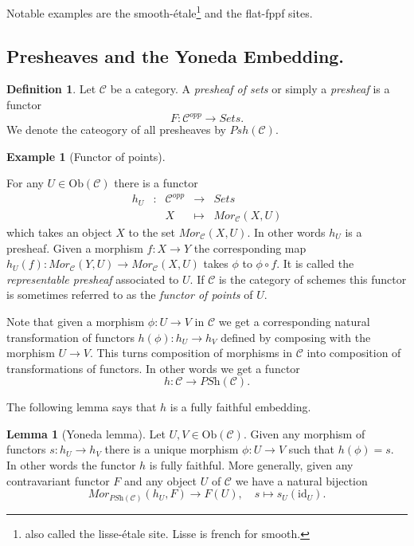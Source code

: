 \documentclass[11pt]{amsart}
\newcommand{\Ob}{\text{Ob}}
\theoremstyle{definition}
\newtheorem{lemma}[theorem]{Lemma}
\newtheorem{definition}[theorem]{Definition}
\newtheorem{example}[theorem]{Example}
\begin{document}
Notable examples are the smooth-\'{e}tale\footnote{also called the lisse-\'{e}tale site. Lisse is french for smooth.} and the flat-fppf sites.

\subsection{Presheaves and the Yoneda Embedding.}

\begin{definition}
	Let $\mathcal{C}$ be a category. A \textit{presheaf of sets} or simply a \textit{presheaf} is a functor
	\[F:\mathcal{C}^{opp}\rightarrow \mathit{Sets}.\]
	We denote the cateogory of all presheaves by $\mathit{Psh}(\mathcal{C})$.
\end{definition}

\begin{example}[Functor of points]
	\label{example-hom-functor}

	For any $U\in \Ob(\mathcal{C})$ there is a
	functor
	$$
	\begin{matrix}
	h_U & : & \mathcal{C}^{opp}
	&
	\longrightarrow
	&
	\textit{Sets} \\
	& &
	X
	&
	\longmapsto
	&
	\textit{Mor}_\mathcal{C}(X, U)
	\end{matrix}
	$$
	which takes an object $X$ to the set
	$\textit{Mor}_\mathcal{C}(X, U)$. In other words $h_U$ is a presheaf.
	Given a morphism $f : X\to Y$ the corresponding map
	$h_U(f) :  \textit{Mor}_\mathcal{C}(Y, U)\to \textit{Mor}_\mathcal{C}(X, U)$
	takes $\phi$ to $\phi\circ f$. It is called the {\it representable presheaf} associated to $U$.
	If $\mathcal{C}$ is the category of schemes this functor is
	sometimes referred to as the
	\emph{functor of points} of $U$.
\end{example}

Note that given a morphism $\phi : U \to V$ in $\mathcal{C}$ we get a
corresponding natural transformation of functors $h(\phi) : h_U \to h_V$
defined by composing with the morphism $U \to V$. This turns
composition of morphisms in $\mathcal{C}$ into composition of
transformations of functors. In other words we get a functor
$$
h :
\mathcal{C}
\longrightarrow
\textit{PSh}(\mathcal{C}).
$$

The following lemma says that $h$ is a fully faithful embedding.

\begin{lemma}[Yoneda lemma]
	\label{lemma-yoneda}
	Let $U, V \in \Ob(\mathcal{C})$.
	Given any morphism of functors $s : h_U \to h_V$
	there is a unique morphism $\phi : U \to V$
	such that $h(\phi) = s$. In other words the
	functor $h$ is fully faithful. More generally,
	given any contravariant functor $F$ and any object
	$U$ of $\mathcal{C}$ we have a natural bijection
	$$
	\mathit{Mor}_{\textit{PSh}(\mathcal{C})}(h_U, F) \longrightarrow F(U),
	\quad
	s \longmapsto s_U(\text{id}_U).
	$$
\end{lemma}
\end{document}
